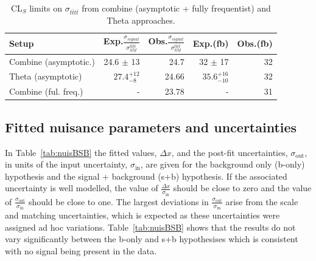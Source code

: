\begin{table}[ht!]
\centering
\begin{tabular}{|l|r|r|r|r|}
 \hline 
 Setup & Exp.$\frac{\sigma_{signal}}{\sigma_{SM}^{t\bar{t}t\bar{t}}}$ & Obs.$\frac{\sigma_{signal}}{\sigma_{SM}^{t\bar{t}t\bar{t}}}$ & Exp.(fb) &Obs.(fb) \\ 
\hline
{\color{blue}Combine (asymptotic.)} & {\color{blue} 24.6 $\pm$ 13}  & {\color{blue}24.7} & {\color{blue} 32  $\pm$ 17}  & {\color{blue}32} \\
\hline
Theta (asymptotic) & $27.4^{+12}_{-8}$ & 24.66 & $35.6^{+16}_{-10}$ & 32 \\
 \hline
Combine (ful. freq.) &  -  & 23.78 &  -  & 31 \\
\hline
\end{tabular}
\caption{CL$_S$ limits on $\sigma_{t\bar{t}t\bar{t}}$ from combine (asymptotic + fully frequentist) and Theta approaches.}
\label{tab:ThetaFreq}
\end{table}


\subsection{Fitted nuisance parameters and uncertainties}


In Table~\ref{tab:nuisBSB} the fitted values, $\Delta x$, and the post-fit uncertainties, $\sigma_{\text{out}}$, in units of the input uncertainty, $\sigma_{\text{in}}$, are given for the background only (b-only) hypothesis and the signal + background (s+b) hypothesis. If the associated uncertainty is well modelled, the value of $\frac{\Delta x}{\sigma_{\text{in}}}$ should be close to zero and the value of $\frac{\sigma_{\text{out}}}{\sigma_{\text{in}}}$ should be close to one. The largest deviations in $\frac{\sigma_{\text{out}}}{\sigma_{\text{in}}}$ arise from the scale and matching uncertainties, which is expected as these uncertainties were assigned ad hoc variations. Table~\ref{tab:nuisBSB} shows that the results do not vary significantly between the b-only and s+b hypothesises which is consistent with no signal being present in the data.

